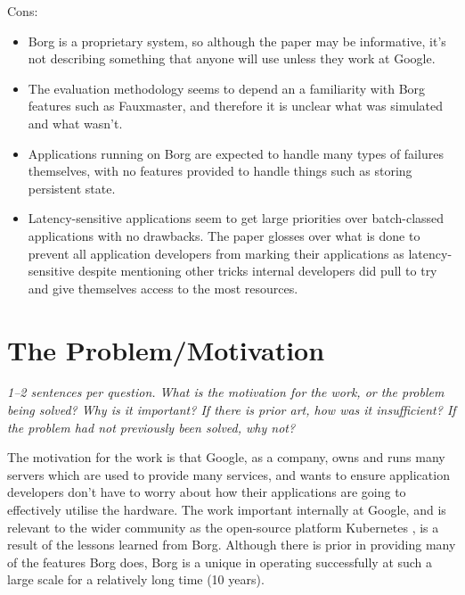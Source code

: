 \documentclass[11pt]{article}
\begin{document}
Cons:

\begin{itemize}

    \item Borg is a proprietary system, so although the paper may be
    informative, it's not describing something that anyone will use unless they
    work at Google.

    \item The evaluation methodology seems to depend an a familiarity with Borg
    features such as Fauxmaster, and therefore it is unclear what was simulated
    and what wasn't.

    \item Applications running on Borg are expected to handle many types of
    failures themselves, with no features provided to handle things such as
    storing persistent state.

    \item Latency-sensitive applications seem to get large priorities over
    batch-classed applications with no drawbacks. The paper glosses over what
    is done to prevent all application developers from marking their
    applications as latency-sensitive despite mentioning other tricks internal
    developers did pull to try and give themselves access to the most
    resources.

\end{itemize}

\section*{The Problem/Motivation}

\textsl{1--2 sentences per question. What is the motivation for the work, or
the problem being solved? Why is it important? If there is prior art, how was
it insufficient? If the problem had not previously been solved, why not?}

The motivation for the work is that Google, as a company, owns and runs many
servers which are used to provide many services, and wants to ensure
application developers don't have to worry about how their applications are
going to effectively utilise the hardware. The work important internally at
Google, and is relevant to the wider community as the open-source platform
Kubernetes \cite{Kubernetes}, is a result of the lessons learned from Borg.
Although there is prior in providing many of the features Borg does, Borg is a
unique in operating successfully at such a large scale for a relatively long
time (10 years).
\end{document}

